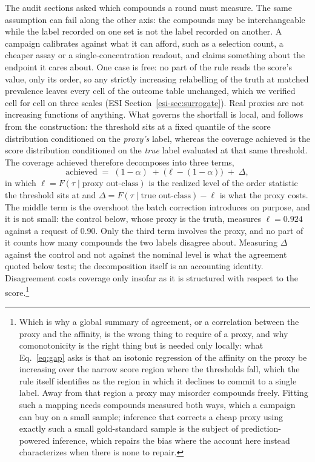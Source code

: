 \documentclass[twocolumn,10pt]{article}
\begin{document}
The audit sections asked which compounds a round must measure. The same assumption can fail
along the other axis: the compounds may be interchangeable while the label recorded on one set is
not the label recorded on another. A campaign calibrates against what it can afford, such as a selection count, a cheaper assay or a single-concentration readout, and claims something about
the endpoint it cares about. One case is free: no part of the rule reads the score's value, only
its order, so any strictly increasing relabelling of the truth at matched prevalence leaves every
cell of the outcome table unchanged, which we verified cell for cell on three scales (ESI
Section~\ref{esi-sec:surrogate}). Real proxies are not increasing functions of anything. What governs the shortfall is local, and follows from the construction: the threshold sits at a fixed quantile of the score distribution conditioned on the \emph{proxy's} label, whereas the coverage achieved is the score distribution conditioned on the \emph{true} label evaluated at that same threshold. The coverage achieved therefore decomposes into three terms,
\begin{equation}
\text{achieved} \;=\; (1-\alpha) \;+\; \bigl(\ell - (1-\alpha)\bigr) \;+\; \Delta,
\label{eq:gap}
\end{equation}
in which $\ell = F(\tau \mid \text{proxy out-class})$ is the realized level of the order statistic the threshold sits at and $\Delta = F(\tau \mid \text{true out-class}) - \ell$ is what the proxy costs. The middle term is the overshoot the batch correction introduces on purpose, and it is not small: the control below, whose proxy is the truth, measures $\ell = 0.924$ against a request of 0.90. Only the third term involves the proxy, and no part of it counts how many compounds the two labels disagree about. Measuring $\Delta$ against the control and not against the nominal level is what the agreement quoted below tests; the decomposition itself is an accounting identity. Disagreement costs coverage only insofar as it is structured with respect to the score.\footnote{Which is why a global summary of agreement, or a correlation between the proxy and the affinity, is the wrong thing to require of a proxy, and why comonotonicity is the right thing but is needed only locally: what Eq.~\ref{eq:gap} asks is that an isotonic regression\citep{Ayer1955Isotonic,Zadrozny2002Isotonic} of the affinity on the proxy be increasing over the narrow score region where the thresholds fall, which the rule itself identifies as the region in which it declines to commit to a single label. Away from that region a proxy may misorder compounds freely. Fitting such a mapping needs compounds measured both ways, which a campaign can buy on a small sample; inference that corrects a cheap proxy using exactly such a small gold-standard sample is the subject of prediction-powered inference,\citep{Angelopoulos2023PPI} which repairs the bias where the account here instead characterizes when there is none to repair.}
\end{document}
